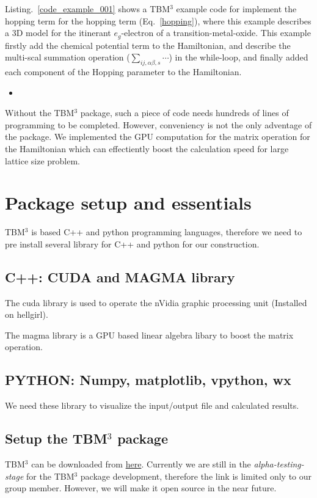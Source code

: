 \documentclass{article}
\newcommand{\codescript}[2]{
\begin{itemize}
\item[]
\end{itemize}
}
\begin{document}
Listing.~\ref{code_example_001} shows a TBM$^{3}$ example code for implement the hopping term for the hopping term (Eq.~\ref{hopping}), where this example describes a 3D model for the itinerant $e_g$-electron of a transition-metal-oxide.
This example firstly add the chemical potential term to the Hamiltonian, and describe the multi-scal summation operation ($\sum_{ij,\alpha\beta,s}\cdots$) in the while-loop, and finally added each component of the Hopping parameter to the Hamiltonian.

\codescript{code_example_001}{Example for implement $H^0$}

Without the TBM$^{3}$ package, such a piece of code needs hundreds of lines of programming to be completed.
However, conveniency is not the only adventage of the package.
We implemented the GPU computation for the matrix operation for the Hamiltonian which can effectiently boost the calculation speed for large lattice size problem.

\section{Package setup and essentials}
TBM$^{3}$ is based C++ and python programming languages, therefore we need to pre install several library for C++ and python for our construction.

\subsection{C++: CUDA and MAGMA library}
The cuda library is used to operate the nVidia graphic processing unit (Installed on hellgirl).

The magma library is a GPU based linear algebra libary to boost the matrix operation.

\subsection{PYTHON: Numpy, matplotlib, vpython, wx}
We need these library to visualize the input/output file and calculated results.

\subsection{Setup the TBM$^3$ package}
TBM$^3$ can be downloaded from 
\href{https://www.dropbox.com/sh/h47v4wwdijj07fy/AAB1sdfAC5KkP-swoGVH6l6ha?dl=0}{{\color{blue} here}}.
Currently we are still in the {\it alpha-testing-stage} for the TBM$^3$ package development, therefore the link is limited only to our group member.
However, we will make it open source in the near future.
\end{document}
